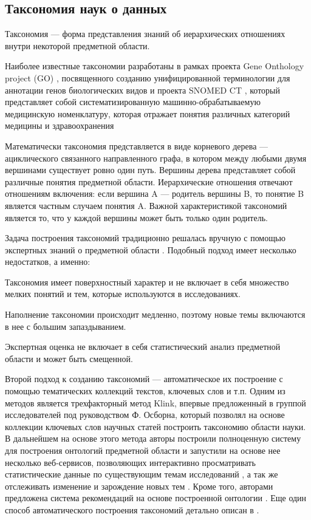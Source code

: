 \documentclass[12pt]{article}
\newenvironment{itemize*}%
{\begin{itemize}%
	\setlength{\itemsep}{0pt}%
	\setlength{\parskip}{0pt}}%
{\end{itemize}}
\let\oldsubsection\subsection
\renewcommand{\subsection}{\clearpage\oldsubsection}
\begin{document}
\subsection{Таксономия наук о данных}

Таксономия --- форма представления знаний об иерархических отношениях внутри некоторой предметной области.

Наиболее известные таксономии разработаны в рамках проекта Gene Onthology project (GO) \cite{gene2018gene}, посвященного созданию унифицированной терминологии для аннотации генов биологических видов и проекта SNOMED CT \cite{lee2013survey}, который представляет собой систематизированную машинно-обрабатываемую медицинскую номенклатуру, которая отражает понятия различных категорий медицины и здравоохранения

Математически таксономия представляется в виде корневого дерева --- ациклического связанного направленного графа, в котором между любыми двумя вершинами существует ровно один путь. Вершины дерева представляет собой различные понятия предметной области. Иерархические отношения отвечают отношениям включения: если вершина A --- родитель вершины B, то понятие B является частным случаем понятия A. Важной характеристикой таксономий является то, что у каждой вершины может быть только один родитель. 

Задача построения таксономий традиционно решалась вручную с помощью экспертных знаний о предметной области \cite{usman2017taxonomies}. Подобный подход имеет несколько недостатков, а именно:
\begin{itemize*}
	\item Таксономия имеет поверхностный характер и не включает в себя множество мелких понятий и тем, которые используются в исследованиях.
	\item Наполнение таксономии происходит медленно, поэтому новые темы включаются в нее с большим запаздыванием.
	\item Экспертная оценка не включает в себя статистический анализ предметной области и может быть смещенной.
\end{itemize*}

Второй подход к созданию таксономий --- автоматическое их построение с помощью тематических коллекций текстов, ключевых слов и т.п. Одним из методов является трехфакторный метод Klink, впервые предложенный в \cite{Osborne2012} группой исследователей под руководством Ф. Осборна, который позволял на основе коллекции ключевых слов научных статей построить таксономию области науки. В дальнейшем на основе этого метода авторы построили полноценную систему для построения онтологий предметной области \cite{Osborne2015} и запустили на основе нее несколько веб-сервисов, позволяющих интерактивно просматривать статистические данные по существующим темам исследований \cite{Salatino2018}, а так же отслеживать изменение и зарождение новых тем \cite{Osborne2013}. Кроме того, авторами предложена система рекомендаций на основе построенной онтологии \cite{Thanapalasingam2018}. Еще один способ автоматического построения таксономий детально описан в \cite{usman2017taxonomies}.
\end{document}
